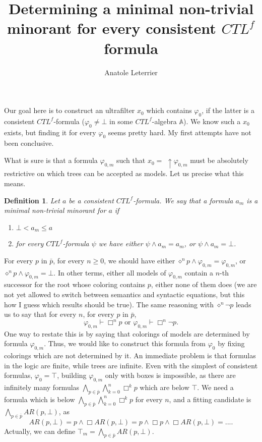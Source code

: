 \documentclass[10pt]{article}
\title{Determining a minimal non-trivial minorant for every consistent $CTL^f$ formula}
\author{Anatole Leterrier}
\newcommand{\A}{{\mathbb A}}
\newtheorem{definition}{Definition}
\begin{document}
\maketitle
Our goal here is to construct an ultrafilter $x_0$ which contains $\varphi_0$, if the latter is a consistent $CTL^f$-formula ($\varphi_0\not=\bot$ in some $CTL^f$-algebra $\A$). We know such a $x_0$ exists, but finding it for every $\varphi_0$ seems pretty hard. My first attempts have not been conclusive.

What is sure is that a formula $\varphi_{0,m}$ such that $x_0 =$ $\uparrow\varphi_{0,m}$ must be absolutely restrictive on which trees can be accepted as models. Let us precise what this means. 
\begin{definition}
    Let $a$ be a consistent $CTL^f$-formula. We say that a formula $a_m$ is a \emph{minimal non-trivial minorant for $a$} if 
    \begin{enumerate}
        \item $\bot<a_m\leq a$
        \item for every $CTL^f$-formula $\psi$ we have either $\psi\wedge a_m=a_m$, or $\psi\wedge a_m=\bot$.
    \end{enumerate}
\end{definition}
For every $p$ in $\bar{p}$, for every $n \geq 0$, we should have either $\diamond^np \wedge \varphi_{0,m} = \varphi_{0,m}$, or $\diamond^np \wedge \varphi_{0,m} =\bot$. In other terms, either all models of $\varphi_{0,m}$ contain a $n$-th successor for the root whose coloring contains $p$, either none of them does (we are not yet allowed to switch between semantics and syntactic equations, but this how I guess which results should be true). The same reasoning with $\diamond^n\neg p$ leads us to say that for every $n$, for every $p$ in $\bar{p}$, \[\varphi_{0,m}\vdash\Box^n p\mbox{ or } \varphi_{0,m}\vdash\Box^n\neg p.\]
One way to restate this is by saying that colorings of models are determined by formula $\varphi_{0,m}$. Thus, we would like to construct this formula from $\varphi_0$ by fixing colorings which are not determined by it. An immediate problem is that formulas in the logic are finite, while trees are infinite. Even with the simplest of consistent formulas, $\varphi_0 = \top$, building $\varphi_{0,m}$ only with boxes is impossible, as there are infinitely many formulas $\bigwedge_{p\in\bar{p}}\bigwedge_{k=0}^n\Box^k p$ which are below $\top$. We need a formula which is below $\bigwedge_{p\in\bar{p}}\bigwedge_{k=0}^n\Box^k p$ for every $n$, and a fitting candidate is $\bigwedge_{p\in\bar{p}}AR(p,\bot)$, as \[AR(p,\bot)=p\wedge\Box AR(p,\bot)=p\wedge\Box p\wedge \Box AR(p,\bot)=... .\] Actually, we can define $\top_m=\bigwedge_{p\in\bar{p}}AR(p,\bot)$. 
\end{document}
